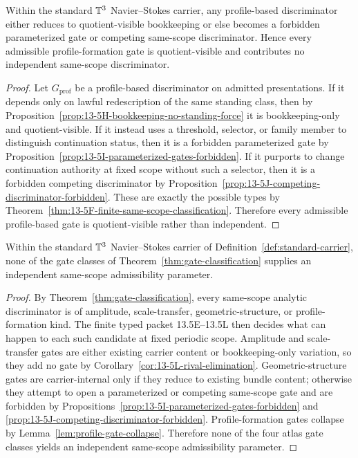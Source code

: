 \begin{lemma}
\label{lem:profile-gate-collapse}
Within the standard $\mathbb{T}^3$ Navier--Stokes carrier, any profile-based discriminator either reduces to
quotient-visible bookkeeping or else becomes a forbidden parameterized gate or competing
same-scope discriminator. Hence every admissible profile-formation gate is quotient-visible and
contributes no independent same-scope discriminator.
\end{lemma}

\begin{proof}
Let $G_{\mathrm{prof}}$ be a profile-based discriminator on admitted presentations. If it depends only
on lawful redescription of the same standing class, then by
Proposition~\ref{prop:13-5H-bookkeeping-no-standing-force} it is bookkeeping-only and quotient-visible.
If it instead uses a threshold, selector, or family member to distinguish continuation status, then it
is a forbidden parameterized gate by Proposition~\ref{prop:13-5I-parameterized-gates-forbidden}. If
it purports to change continuation authority at fixed scope without such a selector, then it is a
forbidden competing discriminator by Proposition~\ref{prop:13-5J-competing-discriminator-forbidden}.
These are exactly the possible types by Theorem~\ref{thm:13-5F-finite-same-scope-classification}.
Therefore every admissible profile-based gate is quotient-visible rather than independent.
\end{proof}

\begin{theorem}
\label{thm:gate-exhaustion}
Within the standard $\mathbb{T}^3$ Navier--Stokes carrier of Definition~\ref{def:standard-carrier}, none of
the gate classes of Theorem~\ref{thm:gate-classification} supplies an independent same-scope
admissibility parameter.
\end{theorem}

\begin{proof}
By Theorem~\ref{thm:gate-classification}, every same-scope analytic discriminator is of amplitude,
scale-transfer, geometric-structure, or profile-formation kind. The finite typed packet
13.5E--13.5L then decides what can happen to each such candidate at fixed periodic scope.
Amplitude and scale-transfer gates are either existing carrier content or bookkeeping-only variation,
so they add no gate by Corollary~\ref{cor:13-5L-rival-elimination}. Geometric-structure gates are
carrier-internal only if they reduce to existing bundle content; otherwise they attempt to open a
parameterized or competing same-scope gate and are forbidden by
Propositions~\ref{prop:13-5I-parameterized-gates-forbidden} and
\ref{prop:13-5J-competing-discriminator-forbidden}. Profile-formation gates collapse by
Lemma~\ref{lem:profile-gate-collapse}. Therefore none of the four atlas gate classes yields an
independent same-scope admissibility parameter.
\end{proof}


